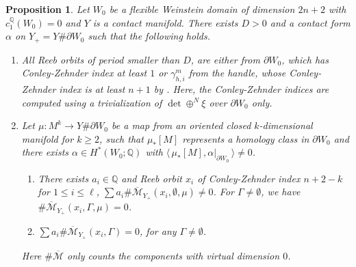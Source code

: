 \documentclass[11pt]{amsart}
\numberwithin{equation}{section}
\newtheorem{proposition}[theorem]{\textbf{Proposition}}
\def\Q{{\mathbb Q}}
\def\cM{{\mathcal M}}
\def\la{\langle\,}
\def\ra{\,\rangle}
\begin{document}
\begin{proposition}\label{prop:curve_flexible}
Let $W_0$ be a flexible Weinstein domain of dimension $2n+2$ with $c_1^{\Q}(W_0)=0$ and $Y$ is a contact manifold. There exists $D>0$ and a contact form $\alpha$ on $Y_+=Y\#\partial W_0$ such that the following holds.
\begin{enumerate}
    \item All Reeb orbits of period smaller than $D$, are either from $\partial W_0$, which has Conley-Zehnder index at least $1$ or $\gamma^m_{h,i}$ from the handle, whose Conley-Zehnder index is at least $n+1$ by . Here, the Conley-Zehnder indices are computed using a trivialization of $\det\oplus^N\xi$ over $\partial W_0$ only.
    \item Let $\mu:M^k\to Y\#\partial W_0$ be a map from an oriented closed $k$-dimensional manifold for $k\ge 2$, such that $\mu_*[M]$ represents a homology class in $\partial W_0$ and there exists $\alpha \in H^*(W_0;\Q)$ with $\la \mu_*[M], \alpha|_{\partial W_0} \ra \ne 0$.
    \begin{enumerate} 
        \item There exists $a_i\in \Q$ and Reeb orbit $x_i$ of Conley-Zehnder index $n+2-k$ for $1\le i \le \ell$, $\sum a_i\#\overline{\cM}_{Y_+}(x_i,\emptyset,\mu)\ne 0$. For $\Gamma \ne \emptyset$, we have $\#\overline{\cM}_{Y_+}(x_i,\Gamma,\mu)=0$.
        \item$\sum a_i\#\overline{\cM}_{Y_+}(x_i,\Gamma)=0$, for any $\Gamma \ne \emptyset$.
    \end{enumerate}
    Here $\#\overline{\cM}$ only counts the components with virtual dimension $0$.
\end{enumerate}
\end{proposition}
\end{document}
